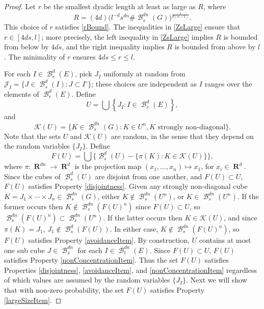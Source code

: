 \documentclass[dvipsnames,letterpaper,12pt]{article}
\numberwithin{equation}{section}
\theoremstyle{plain}
\theoremstyle{remark}
\DeclareMathOperator{\RR}{\mathbf{R}}
\DeclareMathOperator{\setcolon}{\colon}
\DeclareMathOperator{\B}{\mathcal{B}}
\begin{document}
\begin{proof}
	Let $r$ be the smallest dyadic length at least as large as $R$, where
	\begin{equation} \label{What-is-r}
		R = (4d) \big( l^{-d} s^{dn}\# \B^{dn}_s(G)\big)^{\frac{1}{d(n-1)}}.
	\end{equation}
	This choice of $r$ satisfies \eqref{rBound}. 
	The inequalities in \eqref{ZsLarge} ensure that $r \in [4ds,l]$; more precisely, the left inequality in \eqref{ZsLarge} implies $R$ is bounded from below by $4ds$, and the right inequality implies $R$ is bounded from above by $l$. The minimality of $r$ ensures $4ds \leq r \leq l$.

	For each $I \in \B_r^d(E)$, pick $J_I$ uniformly at random from $\mathcal{J}_I = \{ J \in \B^d_s(I) : J \subset I^\circ \}$; these choices are independent as $I$ ranges over the elements of $\B_r^d(E)$. Define
	\[ 	U = \bigcup \left\{ J_I \setcolon I \in \B_r^d(E) \right\}, \]
	and
	\[ \mathcal{K}(U) = \{ K \in \B^{dn}_s(G) \setcolon K \in U^n, \text{$K$ strongly non-diagonal} \}. \]
	Note that the sets $U$ and $\mathcal{K}(U)$ are random, in the sense that they depend on the random variables $\{ J_I \}$. Define
	\begin{equation} \label{defnOfF}
		F(U) = \bigcup \Big\{ \B^d_s(U) - \{ \pi(K) \setcolon K \in \mathcal{K}(U) \} \Big\},
	\end{equation}
	where $\pi \colon \RR^{dn} \to \RR^d$ is the projection map $(x_1, \dots, x_n) \mapsto x_1$, for $x_i \in \RR^d$. Since the cubes of $\B^d_s(U)$ are disjoint from one another, and $F(U) \subset U$, $F(U)$ satisfies Property \ref{disjointness}. Given any strongly non-diagonal cube $K = J_1 \times \cdots \times J_n \in \B_s^{dn}(G)$, either $K \not \in \B_s^{dn}(U^n)$, or $K \in \B_s^{dn}(U^n)$. If the former occurs then $K \not \in \B_s^{dn}(F(U)^n)$ since $F(U) \subset U$, so $\B_s^{dn}(F(U)^n) \subset \B_s^{dn}(U^n)$. If the latter occurs then $K \in \mathcal{K}(U)$, and since $\pi(K) = J_1$, $J_1 \not \in \B_s^d(F(U))$. In either case, $K \not \in \B_s^{dn}(F(U)^n)$, so $F(U)$ satisfies Property \ref{avoidanceItem}. By construction, $U$ contains at most one sub cube $J \in \B^{dn}_s$ for each $I \in \B^{dn}_l(E)$. Since $F(U) \subset U$, $F(U)$ satisfies Property \ref{nonConcentrationItem}. Thus the set $F(U)$ satisfies Properties \ref{disjointness}, \ref{avoidanceItem}, and \ref{nonConcentrationItem} regardless of which values are assumed by the random variables $\{ J_I \}$. Next we will show that with non-zero probability, the set $F(U)$ satisfies Property \ref{largeSizeItem}. 


\end{proof}
\end{document}
